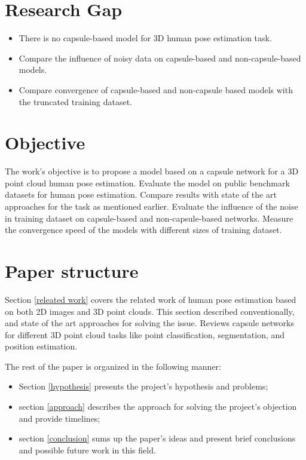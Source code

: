 \section{Research Gap}
\begin{itemize}
  \item There is no capsule-based model for 3D human pose estimation task.
  \item Compare the influence of noisy data on capsule-based and non-capsule-based models.
  \item Compare convergence of capsule-based and non-capsule based models with the truncated training dataset.
\end{itemize}

\section{Objective}
The work's objective is to propose a model based on a capsule network for a 3D point cloud human pose estimation. Evaluate the model on public benchmark datasets for human pose estimation. Compare results with state of the art approaches for the task as mentioned earlier. Evaluate the influence of the noise in training dataset on capsule-based and non-capsule-based networks. Measure the convergence speed of the models with different sizes of training dataset.

\section{Paper structure}
Section \ref{releated work} covers the related work of human pose estimation based on both 2D images and 3D point clouds. This section described conventionally, and state of the art approaches for solving the issue. Reviews capsule networks for different 3D point cloud tasks like point classification, segmentation, and position estimation.

The rest of the paper is organized in the following manner:
\begin{itemize}
  \item Section \ref{hypothesis} presents the project's hypothesis and problems;
  \item  section \ref{approach} describes the approach for solving the project's objection and provide timelines;
  \item  section \ref{conclusion} sums up the paper's ideas and present brief conclusions and possible future work in this field.
\end{itemize}